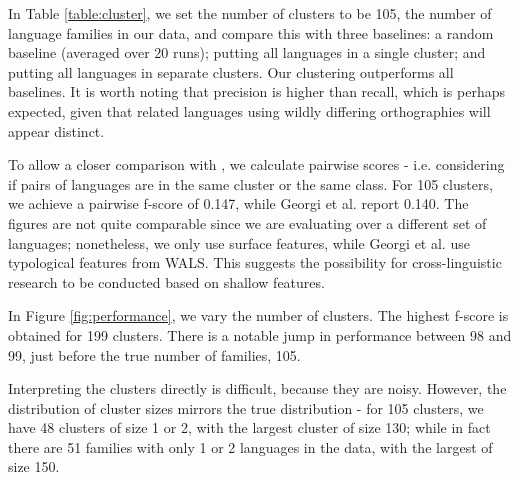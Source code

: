 In Table \ref{table:cluster}, we set the number of clusters to be 105, the number of language families in our data, and compare this with three baselines: a random baseline (averaged over 20 runs); putting all languages in a single cluster; and putting all languages in separate clusters. Our clustering outperforms all baselines. It is worth noting that precision is higher than recall, which is perhaps expected, given that related languages using wildly differing orthographies will appear distinct.

To allow a closer comparison with , we calculate pairwise scores - i.e. considering if pairs of languages are in the same cluster or the same class. For 105 clusters, we achieve a pairwise f-score of 0.147, while Georgi et al. report 0.140. The figures are not quite comparable since we are evaluating over a different set of languages; nonetheless, we only use surface features, while Georgi et al. use typological features from WALS.  This suggests the possibility for cross-linguistic research to be conducted based on shallow features.

In Figure \ref{fig:performance}, we vary the number of clusters. The highest f-score is obtained for 199 clusters. There is a notable jump in performance between 98 and 99, just before the true number of families, 105.

Interpreting the clusters directly is difficult, because they are noisy.  However, the distribution of cluster sizes mirrors the true distribution - for 105 clusters, we have 48 clusters of size 1 or 2, with the largest cluster of size 130; while in fact there are 51 families with only 1 or 2 languages in the data, with the largest of size 150.
